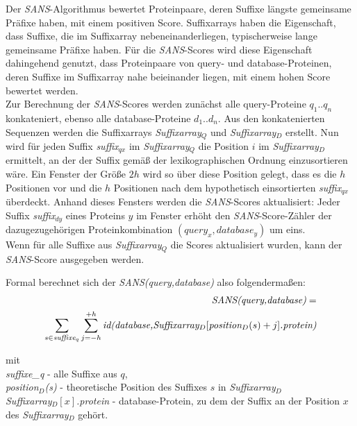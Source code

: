 \documentclass{article}
\begin{document}
Der \emph{SANS}-Algorithmus bewertet Proteinpaare, deren Suffixe längste gemeinsame
Präfixe haben, mit einem positiven Score. Suffixarrays haben die Eigenschaft,
dass Suffixe, die im Suffixarray nebeneinanderliegen, typischerweise lange
gemeinsame Präfixe haben. Für die  \emph{SANS}-Scores wird diese Eigenschaft dahingehend
genutzt, dass Proteinpaare von query- und database-Proteinen, deren Suffixe im
Suffixarray nahe beieinander liegen, mit einem hohen Score bewertet werden.\\
Zur Berechnung der  \emph{SANS}-Scores werden zunächst alle query-Proteine $q_1..q_n$ konkateniert, ebenso alle database-Proteine $d_1..d_n$. 
Aus den konkatenierten Sequenzen werden die Suffixarrays \emph{Suffixarray$_Q$} und \emph{Suffixarray$_D$} erstellt. 
Nun wird für jeden Suffix \emph{suffix$_{qx}$} im \emph{Suffixarray$_Q$} die
Position $i$ im \emph{Suffixarray$_D$} ermittelt, an der der Suffix gemäß der lexikographischen Ordnung einzusortieren wäre. 
Ein Fenster der Größe $2h$ wird so über diese Position gelegt, dass es die $h$
Positionen vor und die $h$ Positionen nach dem hypothetisch einsortierten
\emph{suffix$_{qx}$} überdeckt. 
Anhand dieses Fensters werden die \emph{SANS}-Scores aktualisiert: 
Jeder Suffix \emph{suffix$_{dy}$} eines Proteins $y$ im Fenster erhöht den  \emph{SANS}-Score-Zähler der dazugezugehörigen Proteinkombination $(query_x,database_y)$ um eins. \\
Wenn für alle Suffixe aus \emph{Suffixarray$_Q$} die Scores aktualisiert wurden, kann der  \emph{SANS}-Score ausgegeben werden.

Formal berechnet sich der \emph{SANS(query,database)} also folgendermaßen:\\

\begin{equation*}
  \begin{split}
\text{\emph{SANS(query,database)}} = \\ \sum_{s \in \text{\emph{suffixe$_q$}}} \sum_{j=-h}^{+h} \text{\emph{id(database,Suffixarray$_D[$position$_D(s)  +j]$.protein)}} 
  \end{split}
\end{equation*}

mit\\
\emph{suffixe\_q} - alle Suffixe aus $q$,\\
\emph{position$_D$(s)} - theoretische Position des Suffixes $s$ in \emph{Suffixarray$_D$} \\
\emph{Suffixarray$_D[x]$.protein} - database-Protein, zu dem der Suffix an der Position $x$ des \emph{Suffixarray$_D$} gehört. \\
\end{document}
